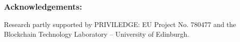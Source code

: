 \subsubsection*{Acknowledgements:}
  Research partly supported by PRIVILEDGE: EU Project No. 780477 and the
  Blockchain Technology Laboratory -- University of Edinburgh.
